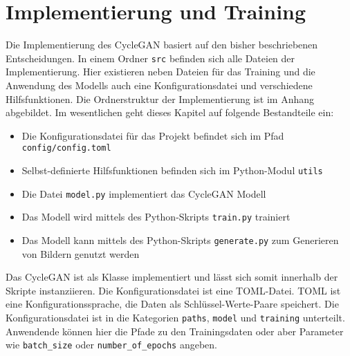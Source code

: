 \chapter{Implementierung und Training}

Die Implementierung des \ac{CycleGAN} basiert auf den bisher beschriebenen Entscheidungen. In einem Ordner \texttt{src} befinden sich alle Dateien der Implementierung. Hier existieren neben Dateien für das Training und die Anwendung des Modells auch eine Konfigurationsdatei und verschiedene Hilfsfunktionen. Die Ordnerstruktur der Implementierung ist im Anhang abgebildet. Im wesentlichen geht dieses Kapitel auf folgende Bestandteile ein:
\begin{itemize}
   \item Die Konfigurationsdatei für das Projekt befindet sich im Pfad \texttt{config/config.toml}
   \item Selbst-definierte Hilfsfunktionen befinden sich im Python-Modul \texttt{utils}
   \item Die Datei \texttt{model.py} implementiert das \ac{CycleGAN} Modell
   \item Das Modell wird mittels des Python-Skripts \texttt{train.py} trainiert
   \item Das Modell kann mittels des Python-Skripts \texttt{generate.py} zum Generieren von Bildern genutzt werden
\end{itemize}

Das \ac{CycleGAN} ist als Klasse implementiert und lässt sich somit innerhalb der Skripte instanziieren. Die Konfigurationsdatei ist eine \acs{TOML}-Datei. \ac{TOML} ist eine Konfigurationssprache, die Daten als Schlüssel-Werte-Paare speichert. Die Konfigurationsdatei ist in die Kategorien \texttt{paths}, \texttt{model} und \texttt{training} unterteilt. Anwendende können hier die Pfade zu den Trainingsdaten oder aber Parameter wie \texttt{batch_size} oder \texttt{number_of_epochs} angeben.








